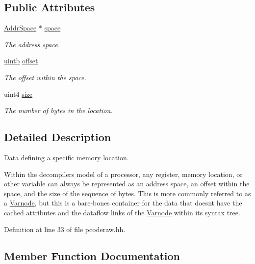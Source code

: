 \subsection*{Public Attributes}
\begin{DoxyCompactItemize}
\item 
\mbox{\hyperlink{class_addr_space}{Addr\+Space}} $\ast$ \mbox{\hyperlink{struct_varnode_data_a1a69a5187f7a6376c0c93c08962ea68d}{space}}
\begin{DoxyCompactList}\small\item\em The address space. \end{DoxyCompactList}\item 
\mbox{\hyperlink{types_8h_a2db313c5d32a12b01d26ac9b3bca178f}{uintb}} \mbox{\hyperlink{struct_varnode_data_a1a511384ee72e847b51423cc99c8233e}{offset}}
\begin{DoxyCompactList}\small\item\em The offset within the space. \end{DoxyCompactList}\item 
uint4 \mbox{\hyperlink{struct_varnode_data_a50d39ae46d51c8854b962f3ec4ee4e25}{size}}
\begin{DoxyCompactList}\small\item\em The number of bytes in the location. \end{DoxyCompactList}\end{DoxyCompactItemize}


\subsection{Detailed Description}
Data defining a specific memory location. 

Within the decompiler\textquotesingle{}s model of a processor, any register, memory location, or other variable can always be represented as an address space, an offset within the space, and the size of the sequence of bytes. This is more commonly referred to as a \mbox{\hyperlink{class_varnode}{Varnode}}, but this is a bare-\/bones container for the data that doesn\textquotesingle{}t have the cached attributes and the dataflow links of the \mbox{\hyperlink{class_varnode}{Varnode}} within its syntax tree. 

Definition at line 33 of file pcoderaw.\+hh.



\subsection{Member Function Documentation}
\mbox{\label{struct_varnode_data_a815490509cf832fbb9dc45214dd33c8e}} 

